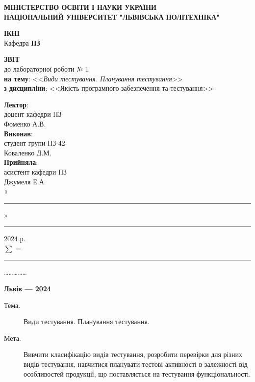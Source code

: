\documentclass[oneside,14pt]{extarticle}
\newcommand\subject{Якість програмного забезпечення та тестування}
\newcommand\lecturer{доцент кафедри ПЗ\\Фоменко А.В.}
\newcommand\teacher{асистент кафедри ПЗ\\Джумеля Е.А.}
\newcommand\mygroup{ПЗ-42}
\newcommand\lab{1}
\newcommand\theme{Види тестування. Планування тестування}
\newcommand\purpose{Вивчити класифікацію видів тестування, розробити перевірки для
	різних видів тестування, навчитися планувати тестові активності в залежності
	від особливостей продукції, що поставляється на тестування
	функціональності}
\begin{document}
\begin{normalsize}
	\begin{titlepage}
		\thispagestyle{empty}
		\begin{center}
			\textbf{МІНІСТЕРСТВО ОСВІТИ І НАУКИ УКРАЇНИ\\
				НАЦІОНАЛЬНИЙ УНІВЕРСИТЕТ "ЛЬВІВСЬКА ПОЛІТЕХНІКА"}
		\end{center}
		\begin{flushright}
			\textbf{ІКНІ}\\
			Кафедра \textbf{ПЗ}
		\end{flushright}
		\vspace{80pt}
		\begin{center}
			\textbf{ЗВІТ}\\
			\vspace{10pt}
			до лабораторної роботи № \lab\\
			\textbf{на тему}: <<\textit{\theme}>>\\
			\textbf{з дисципліни}: <<\subject>>
		\end{center}
		\vspace{80pt}
		\begin{flushright}
			
			\textbf{Лектор}:\\
			\lecturer\\
			\vspace{28pt}
			\textbf{Виконав}:\\
			
			студент групи \mygroup\\
			Коваленко Д.М.\\
			\vspace{28pt}
			\textbf{Прийняла}:\\
			
			\teacher\\
			
			\vspace{28pt}
			«\rule{1cm}{0.15mm}» \rule{1.5cm}{0.15mm} 2024 р.\\
			$\sum$ = \rule{1cm}{0.15mm}……………\\
			
		\end{flushright}
		\vspace{\fill}
		\begin{center}
			\textbf{Львів — 2024}
		\end{center}
	\end{titlepage}
		
	\begin{description}
		\item[Тема.] \theme.
		\item[Мета.] \purpose.
	\end{description}


\end{normalsize}
\end{document}

